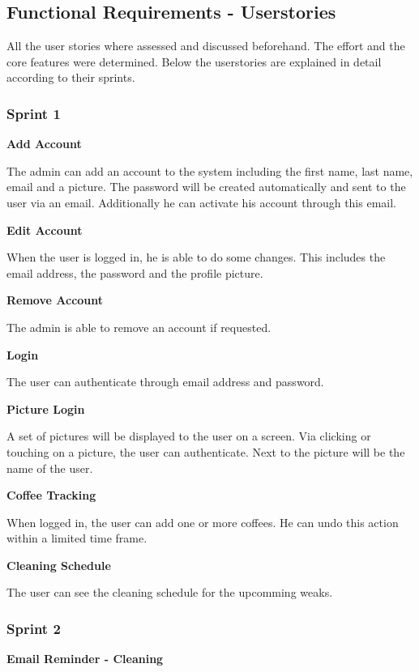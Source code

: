 \subsection{Functional Requirements -
Userstories}\label{functional-requirements---userstories}

All the user stories where assessed and discussed beforehand. The effort
and the core features were determined. Below the userstories are
explained in detail according to their sprints.

\subsubsection{Sprint 1}\label{sprint-1}

\textbf{Add Account}

The admin can add an account to the system including the first name,
last name, email and a picture. The password will be created
automatically and sent to the user via an email. Additionally he can
activate his account through this email.

\textbf{Edit Account}

When the user is logged in, he is able to do some changes. This includes
the email address, the password and the profile picture.

\textbf{Remove Account}

The admin is able to remove an account if requested.

\textbf{Login}

The user can authenticate through email address and password.

\textbf{Picture Login}

A set of pictures will be displayed to the user on a screen. Via
clicking or touching on a picture, the user can authenticate. Next to
the picture will be the name of the user.

\textbf{Coffee Tracking}

When logged in, the user can add one or more coffees. He can undo this
action within a limited time frame.

\textbf{Cleaning Schedule}

The user can see the cleaning schedule for the upcomming weaks.

\subsubsection{Sprint 2}\label{sprint-2}

\textbf{Email Reminder - Cleaning}

